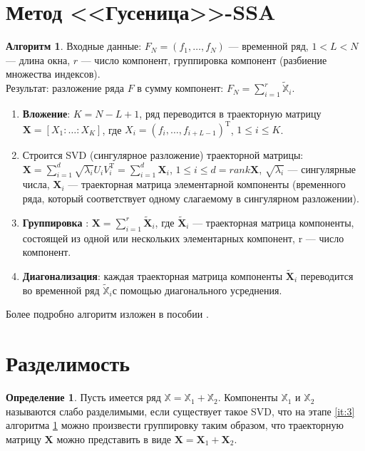 \documentclass[specialist, substylefile = spbureport.rtx, subf,href,colorlinks=true, 12pt]{disser}
\theoremstyle{definition}
\newtheorem{definition}{Определение}
\newtheorem{algorithm}{Алгоритм}
\begin{document}
\section{Метод <<Гусеница>>-SSA}
\label{sec12}
\begin{algorithm}
\label{alg1}
    Входные данные: $F_N=(f_1, \ldots, f_N)$ --- временной ряд, $1<L<N$ --- длина окна, $r$ --- число компонент, группировка компонент (разбиение множества индексов).\\
    Результат: разложение ряда $F$ в сумму компонент: $F_N = \sum_{i = 1}^{r}\widetilde{\mathbb{X}}_i$.
    \begin{enumerate}
	    \item \textbf{Вложение}: $K=N-L+1$, ряд переводится в траекторную матрицу $\bm{X}=[X_1:\ldots:X_K]$, где $X_i = (f_i, \ldots, f_{i + L - 1})^{\mathrm{T}}$, $1 \leq i \leq K$.

	    \item Строится SVD (сингулярное разложение) траекторной матрицы: $\bm{X} = \sum\limits_{i=1}^d \sqrt{\lambda_i}U_iV_i^{\mathrm{T}} = \sum\limits_{i=1}^d\bm{X}_i$, $1 \leq i \leq d = rank\bm{X}$, $\sqrt{\lambda_i}$ --- сингулярные числа, $\bm{X}_i$ --- траекторная матрица элементарной компоненты (временного ряда, который соответствует одному слагаемому в сингулярном разложении).

	    \item \textbf{Группировка} \label{it:3}: $\bm{X} =  \sum\limits_{i=1}^r \widetilde{\bm{X}}_i$, где $\widetilde{\bm{X}}_i$ --- траекторная матрица компоненты, состоящей из одной или нескольких элементарных компонент, r --- число компонент.

	    \item \textbf{Диагонализация}: каждая траекторная матрица компоненты $\widetilde{\bm{X}}_i$ переводится во временной ряд $\widetilde{\mathbb{X}}_i$с помощью диагонального усреднения.
	\end{enumerate} 
	Более подробно алгоритм изложен в пособии \cite{Golyandina04}.
\end{algorithm}

\section{Разделимость}

\begin{definition}
\label{def1}
        Пусть имеется ряд $\mathbb{X} = \mathbb{X}_1 + \mathbb{X}_2$. Компоненты $\mathbb{X}_1$ и $\mathbb{X}_2$ называются слабо разделимыми, если существует такое SVD, что на этапе \ref{it:3}  алгоритма \ref{alg1} можно произвести группировку таким образом, что траекторную матрицу $\mathbf{X}$ можно представить в виде $\mathbf{X} = \mathbf{X}_1 + \mathbf{X}_2$.
\end{definition}
\end{document}
